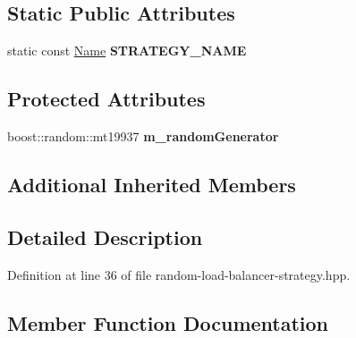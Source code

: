 \subsection*{Static Public Attributes}
\begin{DoxyCompactItemize}
\item 
static const \hyperlink{classndn_1_1Name}{Name} {\bfseries S\+T\+R\+A\+T\+E\+G\+Y\+\_\+\+N\+A\+ME}\hypertarget{classnfd_1_1fw_1_1RandomLoadBalancerStrategy_a70c27fcddd9929dc3ee9e418bba8f225}{}\label{classnfd_1_1fw_1_1RandomLoadBalancerStrategy_a70c27fcddd9929dc3ee9e418bba8f225}

\end{DoxyCompactItemize}
\subsection*{Protected Attributes}
\begin{DoxyCompactItemize}
\item 
boost\+::random\+::mt19937 {\bfseries m\+\_\+random\+Generator}\hypertarget{classnfd_1_1fw_1_1RandomLoadBalancerStrategy_aeda284b905becfc73eecfca218248ab7}{}\label{classnfd_1_1fw_1_1RandomLoadBalancerStrategy_aeda284b905becfc73eecfca218248ab7}

\end{DoxyCompactItemize}
\subsection*{Additional Inherited Members}


\subsection{Detailed Description}


Definition at line 36 of file random-\/load-\/balancer-\/strategy.\+hpp.



\subsection{Member Function Documentation}
